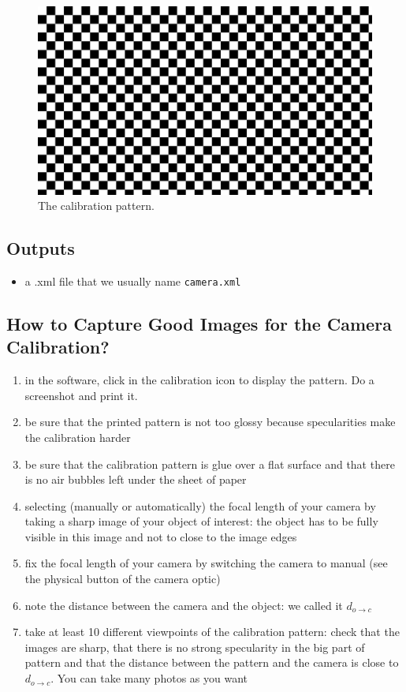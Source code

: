 \documentclass[11pt]{article}
\begin{document}
 \begin{figure}[h]
 	\begin{center}
 		\includegraphics[width=11 cm]{images/calibPattern.png}
 	\end{center}
 	\caption{The calibration pattern.}
 	\label{fig:calibPattern}
 \end{figure}

\subsection{Outputs}
\begin{itemize}
\item a .xml file that we usually name {\tt camera.xml}
\end{itemize}

\subsection{How to Capture Good Images for the Camera Calibration?}
\begin{enumerate}
\item in the software, click in the calibration icon to display the pattern. Do a screenshot and print it.
\item be sure that the printed pattern is not too glossy because specularities make the calibration harder
\item be sure that the calibration pattern is glue over a flat surface and that there is no air bubbles left under the sheet of paper
\item selecting (manually or automatically) the focal length of your camera by taking a sharp image of your object of interest: the object has to be fully visible in this image and not to close to the image edges
\item fix the focal length of your camera by switching the camera to manual (see the physical button of the camera optic)
\item note the distance between the camera and the object: we called it $d_{o \rightarrow c}$
\item take at least 10 different viewpoints of the calibration pattern: check that the images are sharp, that there is no strong specularity in the big part of pattern and that the distance between the pattern and the camera is close to $d_{o \rightarrow c}$. You can take many photos as you want
\end{enumerate}
\end{document}
